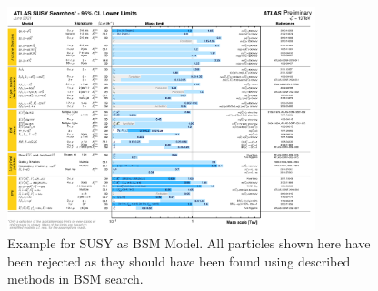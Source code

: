 \documentclass[../Bachelorarbeit.tex]{subfiles}
\begin{document}
\begin{figure}[h]
    \centering
    \includegraphics[width=0.8\textwidth]{images/fig_23_ATLAS_SUSY.png}
    \caption{Example for SUSY as BSM Model. All particles shown here have been rejected as they should have been found using described methods in BSM search.  \cite{.07.06.2021}}
    \label{fig:ATLAS_SUSY}
\end{figure}
\end{document}
